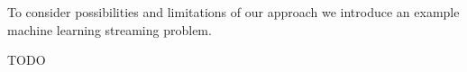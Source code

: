 To consider possibilities and limitations of our approach we introduce an example machine learning streaming problem.


TODO
